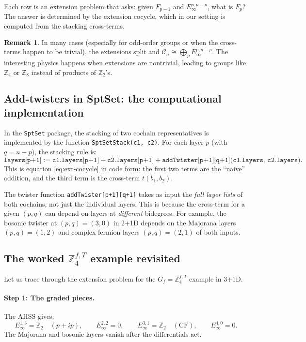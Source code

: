 \documentclass{SciPost}
\theoremstyle{definition}
\newtheorem{remark}[theorem]{Remark}
\newcommand{\Zt}{\mathbb{Z}_2}
\newcommand{\Zn}[1]{\mathbb{Z}_{#1}}
\newcommand{\Gf}{G_f}
\begin{document}
Each row is an extension problem that asks: given $F_{p-1}$ and $E_\infty^{p, n-p}$, what is $F_p$?
The answer is determined by the extension cocycle, which in our setting is computed from the stacking cross-terms.

\begin{remark}
In many cases (especially for odd-order groups or when the cross-terms happen to be trivial), the extensions split and $\mathcal{C}_n \cong \bigoplus_p E_\infty^{p, n-p}$.
The interesting physics happens when extensions are nontrivial, leading to groups like $\Zn{4}$ or $\Zn{8}$ instead of products of $\Zt$'s.
\end{remark}

\subsection{Add-twisters in SptSet: the computational implementation}
\label{subsec:addtwister-code}

In the \texttt{SptSet} package, the stacking of two cochain representatives is implemented by the function \texttt{SptSetStack(c1, c2)}.
For each layer $p$ (with $q = n - p$), the stacking rule is:
\begin{equation}
\label{eq:stack-code}
\texttt{layers[p+1]} := \texttt{c1.layers[p+1]} + \texttt{c2.layers[p+1]} + \texttt{addTwister[p+1][q+1](c1.layers, c2.layers)}.
\end{equation}
This is equation \eqref{eq:ext-cocycle} in code form: the first two terms are the ``naive'' addition, and the third term is the cross-term $t(b_1, b_2)$.

The twister function \texttt{addTwister[p+1][q+1]} takes as input the \emph{full layer lists} of both cochains, not just the individual layers.
This is because the cross-term for a given $(p,q)$ can depend on layers at \emph{different} bidegrees.
For example, the bosonic twister at $(p,q) = (3,0)$ in 2+1D depends on the Majorana layers $(p,q) = (1,2)$ and complex fermion layers $(p,q) = (2,1)$ of both inputs.

\subsection{The worked $\Zn{4}^{f,T}$ example revisited}
\label{subsec:z4ft-revisited}

Let us trace through the extension problem for the $\Gf = \Zn{4}^{f,T}$ example in 3+1D.

\paragraph{Step 1: The graded pieces.}
The AHSS gives:
\begin{equation}
E_\infty^{1,3} = \Zt \quad (p+ip), \qquad E_\infty^{2,2} = 0, \qquad E_\infty^{3,1} = \Zt \quad (\text{CF}), \qquad E_\infty^{4,0} = 0.
\end{equation}
The Majorana and bosonic layers vanish after the differentials act.
\end{document}
